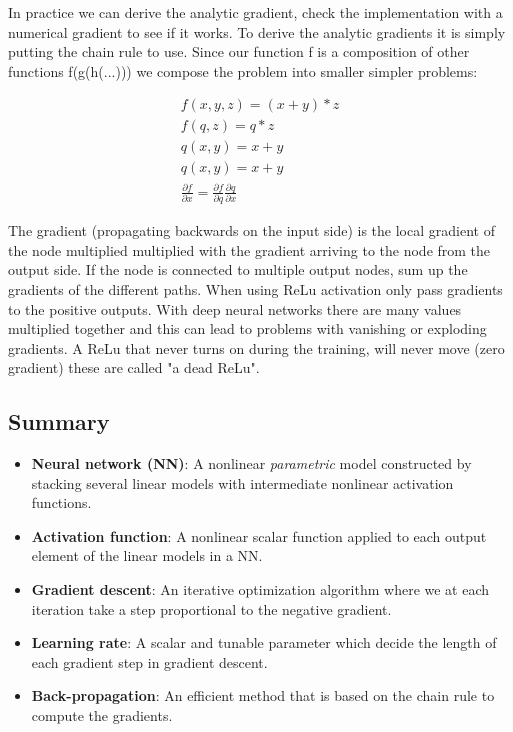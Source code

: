 In practice we can derive the analytic gradient, check the implementation with a numerical gradient to see if it works. To derive the analytic gradients it is simply putting the chain rule to use. Since our function f is a composition of other functions f(g(h(...))) we compose the problem into smaller simpler problems:

	\begin{equation}
	\begin{aligned}
		f(x,y,z) = (x+y) * z \\
		f(q,z) = q * z \\
		q(x,y) = x + y \\
		q(x,y) = x + y \\
		\frac{\partial f} {\partial x} = \frac{\partial f} {\partial q} \frac{\partial q} {\partial x} 
	\end{aligned}
	\end{equation}

The gradient (propagating backwards on the input side) is the local gradient of the node multiplied multiplied with the gradient arriving to the node from the output side. If the node is connected to multiple output nodes, sum up the gradients of the different paths. When using ReLu activation only pass gradients to the positive outputs. With deep neural networks there are many values multiplied together and this can lead to problems with vanishing or exploding gradients. A ReLu that never turns on during the training, will never move (zero gradient) these are called "a dead ReLu".


\subsection*{Summary}

\begin{itemize}
	\item \textbf{Neural network (NN)}: A nonlinear \emph{parametric} model constructed by stacking several linear models with intermediate nonlinear activation functions.
	\item \textbf{Activation function}: A nonlinear scalar function applied to each output element of the linear models in a NN.
	\item \textbf{Gradient descent}: An iterative optimization algorithm where we at each iteration take a step proportional to the negative gradient.
	\item \textbf{Learning rate}: A scalar and tunable parameter which decide the length of each gradient step in gradient descent.
	\item \textbf{Back-propagation}: An efficient method that is based on the chain rule to compute the gradients.  
\end{itemize}






